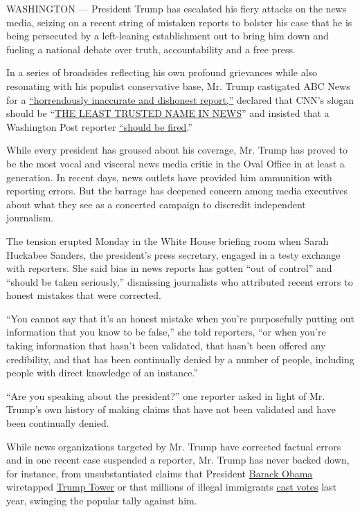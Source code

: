 WASHINGTON --- President Trump has escalated his fiery attacks on the
news media, seizing on a recent string of mistaken reports to bolster
his case that he is being persecuted by a left-leaning establishment out
to bring him down and fueling a national debate over truth,
accountability and a free press.

In a series of broadsides reflecting his own profound grievances while
also resonating with his populist conservative base, Mr. Trump
castigated ABC News for a
\href{https://twitter.com/realdonaldtrump/status/937145025359761408?lang=en}{``horrendously
inaccurate and dishonest report,''} declared that CNN's slogan should be
``\href{https://twitter.com/realDonaldTrump/status/939485131693322240}{THE
LEAST TRUSTED NAME IN NEWS}'' and insisted that a Washington Post
reporter
\href{https://twitter.com/realDonaldTrump/status/939634404267380736}{``should
be fired}.''

While every president has groused about his coverage, Mr. Trump has
proved to be the most vocal and visceral news media critic in the Oval
Office in at least a generation. In recent days, news outlets have
provided him ammunition with reporting errors. But the barrage has
deepened concern among media executives about what they see as a
concerted campaign to discredit independent journalism.

The tension erupted Monday in the White House briefing room when Sarah
Huckabee Sanders, the president's press secretary, engaged in a testy
exchange with reporters. She said bias in news reports has gotten ``out
of control'' and ``should be taken seriously,'' dismissing journalists
who attributed recent errors to honest mistakes that were corrected.

``You cannot say that it's an honest mistake when you're purposefully
putting out information that you know to be false,'' she told reporters,
``or when you're taking information that hasn't been validated, that
hasn't been offered any credibility, and that has been continually
denied by a number of people, including people with direct knowledge of
an instance.''

``Are you speaking about the president?'' one reporter asked in light of
Mr. Trump's own history of making claims that have not been validated
and have been continually denied.

While news organizations targeted by Mr. Trump have corrected factual
errors and in one recent case suspended a reporter, Mr. Trump has never
backed down, for instance, from unsubstantiated claims that President
\href{https://www.nytimes3xbfgragh.onion/topic/person/barack-obama}{Barack
Obama} wiretapped
\href{https://www.nytimes3xbfgragh.onion/2017/03/04/us/politics/trump-obama-tap-phones.html}{Trump
Tower} or that millions of illegal immigrants
\href{https://www.nytimes3xbfgragh.onion/2017/01/23/us/politics/donald-trump-congress-democrats.html}{cast
votes} last year, swinging the popular tally against him.

